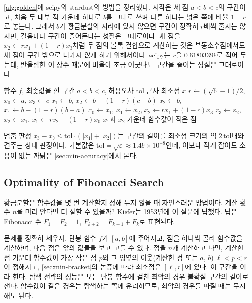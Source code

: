 \cref{alg:golden}에 scipy와 stardust의  방법을 정리했다. 시작은 세 점 $a<b<c$의 구간이고, 처음 두 내부 점 가운데 하나로 $b$를 그대로 쓰며 다른 하나는 넓은 쪽에 비율 $1-r$로 놓는다. 그래서 $b$가 황금분할의 자리에 있지 않으면 구간이 정확히 $r$배씩 줄지는 않지만, 걸음마다 구간이 줄어든다는 성질은 그대로이다. 새 점을 $x_2\gets rx_1+(1-r)x_3$처럼 두 점의 볼록 결합으로 계산하는 것은 부동소수점에서도 새 점이 구간 밖으로 나가지 않게 하기 위해서이다. scipy는 $r$을 $0.61803399$로 적어 두는데, 반올림한 이 상수 때문에 비율이 조금 어긋나도 구간을 줄이는 성질은 그대로이다.

\begin{algorithm}[t]
\begin{algorithmic}[1]
\Require 함수 $f$, 최솟값을 낀 구간 $a<b<c$, 허용오차 $\mathrm{tol}$
\Ensure 근사 최소점 $x$
\State $r\gets(\sqrt5-1)/2$, $x_0\gets a$, $x_3\gets c$
  \State $x_1\gets b$, $x_2\gets b+(1-r)(c-b)$ 
\Else
  \State $x_2\gets b$, $x_1\gets b-(1-r)(b-a)$
\EndIf
{}
    \State $x_0\gets x_1$, $x_1\gets x_2$, $x_2\gets rx_1+(1-r)x_3$ 
  \Else
    \State $x_3\gets x_2$, $x_2\gets x_1$, $x_1\gets rx_2+(1-r)x_0$ 
  \EndIf
\EndWhile
\State \Return $x_1$과 $x_2$ 가운데 함수값이 작은 점
\end{algorithmic}
\caption{황금분할 탐색}
\label{alg:golden}
\end{algorithm}

멈춤 판정 $x_3-x_0\le\mathrm{tol}\cdot(|x_1|+|x_2|)$는 구간의 길이를 최소점 크기의 약 $2\,\mathrm{tol}$배와 견주는 상대 판정이다. 기본값은 $\mathrm{tol}=\sqrt{\varepsilon}\approx1.49\times10^{-8}$인데, 이보다 작게 잡아도 소용이 없는 까닭은 \cref{sec:min-accuracy}에서 본다.

\subsection{Optimality of Fibonacci Search}

황금분할은 함수값을 몇 번 계산할지 정해 두지 않을 때 자연스러운 방법이다. 계산 횟수 $n$을 미리 안다면 더 잘할 수 있을까? Kiefer는 1953년에 이 질문에 답했다\cite{kiefer1953}. 답은 Fibonacci 수 $F_1=F_2=1$, $F_{k+2}=F_{k+1}+F_k$로 표현된다.

문제를 정확히 세우자. 단봉 함수 $f$가 $[a,b]$에 주어지고, 점을 하나씩 골라 함수값을 계산하며, 다음 점은 앞의 값들을 보고 고를 수 있다. 점을 $n$개 계산하고 나면, 계산한 점 가운데 함수값이 가장 작은 점 $p$와 그 양옆의 이웃(계산한 점 또는 $a$, $b$) $\ell<p<r$이 정해지고, \cref{sec:min-bracket}의 논증에 따라 최소점은 $[\ell,r]$에 있다. 이 구간을 이라 한다. 탐색 전략의 성능은 모든 단봉 함수에 걸친 최악의 경우 불확실 구간의 길이로 잰다. 함수값이 같은 경우는 탐색하는 쪽에 유리하므로, 최악의 경우를 따질 때는 무시해도 된다.

